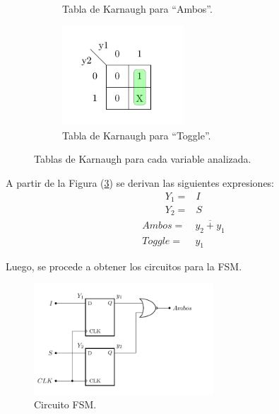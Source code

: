 \begin{figure}[H]
\begin{subfigure}{.49\textwidth}
	\caption{Tabla de Karnaugh para ``Ambos''.}
	\label{fig:fsm3}
\end{subfigure}
\begin{subfigure}{.49\textwidth}
\centering
	\includegraphics[width=0.5\textwidth]{ImagenesEjercicio1/Mapa4.pdf}
	\caption{Tabla de Karnaugh para ``Toggle''.}
	\label{fig:fsm4}
\end{subfigure}
\caption{Tablas de Karnaugh para cada variable analizada.}
\label{fig:kar}
\end{figure}

A partir de la Figura (\ref{fig:kar}) se derivan las siguientes expresiones:
\begin{equation}
\begin{split}
	Y_1 = & I \\
	Y_2 = & S 
\end{split}
\end{equation}
\begin{equation}
\begin{split}
Ambos = & \ \overline{y_2+y_1} \\
Toggle = & \ y_1
\end{split}
\end{equation}

Luego, se procede a obtener los circuitos para la FSM.
\begin{figure}[H]
\centering
	\includegraphics[width=0.6\textwidth, page=1]{ImagenesEjercicio1/Circuitos.pdf}
		\caption{Circuito FSM.}
	\label{fig:fsm1}
\end{figure}

